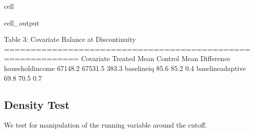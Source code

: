 \documentclass[letterpaper,10pt,english]{jupyterBook}
\begin{document}
\begin{sphinxuseclass}{cell}
\begin{sphinxVerbatimOutput}
\begin{sphinxuseclass}{cell_output}
\begin{sphinxVerbatim}[commandchars=\\\{\}]
Table 3: Covariate Balance at Discontinuity
============================================================
        Covariate Treated Mean Control Mean Difference
 household\PYGZus{}income      67148.2      67531.5     \PYGZhy{}383.3
      baseline\PYGZus{}iq         85.6         85.2        0.4
baseline\PYGZus{}adaptive         69.8         70.5       \PYGZhy{}0.7
\end{sphinxVerbatim}

\end{sphinxuseclass}\end{sphinxVerbatimOutput}

\end{sphinxuseclass}

\subsection{Density Test}
\label{\detokenize{results:density-test}}
\sphinxAtStartPar
We test for manipulation of the running variable around the cutoff.
\end{document}
